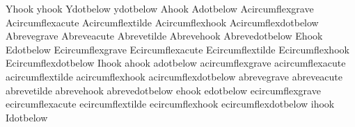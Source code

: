    Yhook                {}
   yhook                {}
   Ydotbelow            {}
   ydotbelow            {}
   Ahook                {}
   Adotbelow            {}
   Acircumflexgrave     {}
   Acircumflexacute     {}
   Acircumflextilde     {}
   Acircumflexhook      {}
   Acircumflexdotbelow  {}
   Abrevegrave          {}
   Abreveacute          {}
   Abrevetilde          {}
   Abrevehook           {}
   Abrevedotbelow       {}
   Ehook                {}
   Edotbelow            {}
   Ecircumflexgrave     {}
   Ecircumflexacute     {}
   Ecircumflextilde     {}
   Ecircumflexhook      {}
   Ecircumflexdotbelow  {}
   Ihook                {}
   ahook                {}
   adotbelow            {}
   acircumflexgrave     {}
   acircumflexacute     {}
   acircumflextilde     {}
   acircumflexhook      {}
   acircumflexdotbelow  {}
   abrevegrave          {}
   abreveacute          {}
   abrevetilde          {}
   abrevehook           {}
   abrevedotbelow       {}
   ehook                {}
   edotbelow            {}
   ecircumflexgrave     {}
   ecircumflexacute     {}
   ecircumflextilde     {}
   ecircumflexhook      {}
   ecircumflexdotbelow  {}
   ihook                {}
   Idotbelow            {}
